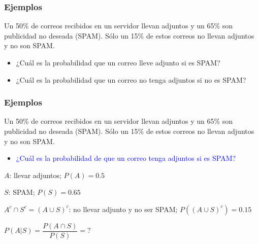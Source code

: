 \documentclass[handout]{beamer}\usepackage[]{graphicx}\usepackage[]{color}
\newcommand{\red}[1]{\textcolor{red}{#1}}
\newcommand{\blue}[1]{\textcolor{blue}{#1}}
\renewcommand{\emph}[1]{{\color{red}#1}}
\theoremstyle{plain}
\theoremstyle{definition}
\begin{document}
%
%
%
%
%
%
%
%

\begin{frame}
\frametitle{Ejemplos}

Un 50\% de  correos recibidos en un servidor llevan adjuntos  y un 65\% son  publicidad no deseada (SPAM). Sólo un 15\% de estos correos no llevan adjuntos y no son SPAM. 

\begin{itemize}
\item ¿Cuál  es la probabilidad que un correo  lleve adjunto si es SPAM?

\item ¿Cuál es la probabilidad que un correo \emph{no} tenga adjuntos si \emph{no}  es SPAM?
\end{itemize}

\end{frame}

\begin{frame}
\frametitle{Ejemplos}

Un 50\% de  correos recibidos en un servidor llevan adjuntos  y un 65\% son  publicidad no deseada (SPAM). Sólo un 15\% de estos correos no llevan adjuntos y no son SPAM. 

\begin{itemize}
\item \blue{¿Cuál es la probabilidad de que un correo tenga adjuntos si es SPAM?}

\end{itemize}

$A$: llevar adjuntos; $P(A)=0.5$
\medskip

$S$: SPAM; $P(S)=0.65$
\medskip

$A^c\cap S^c=(A\cup S)^c$: no llevar adjunto y no ser SPAM; $P((A\cup S)^c)=0.15$
\medskip

$P(A|S)=\dfrac{P(A\cap S)}{P(S)}=?$


\end{frame}
\end{document}
